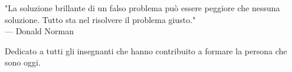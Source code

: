 
\cleardoublepage
{}
\thispagestyle{empty}

\vspace*{3cm}

\begin{center}
"La soluzione brillante di un falso problema può essere peggiore che nessuna soluzione. Tutto sta nel risolvere il problema giusto." \\ \medskip
--- Donald Norman
\end{center}

\medskip

\begin{center}
Dedicato a tutti gli insegnanti che hanno contribuito a formare la persona che sono oggi.
\end{center}
